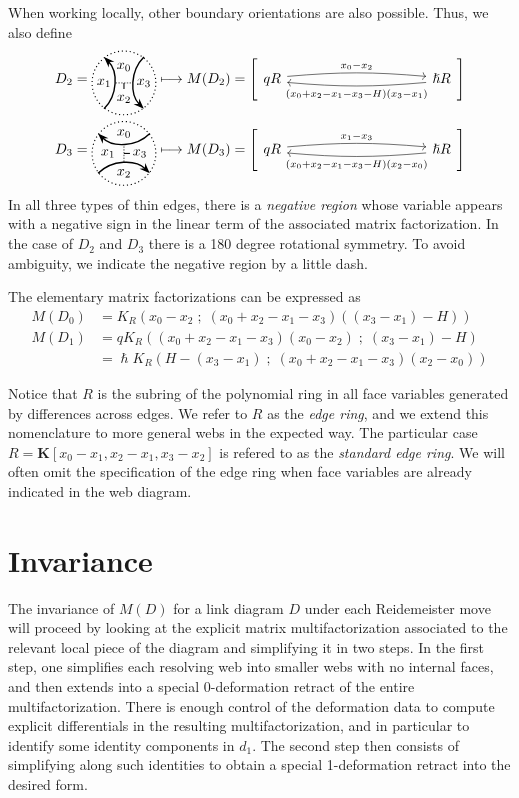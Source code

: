 \documentclass{article}
\renewcommand{\sc}{\; ; \;}
\newcommand{\mf}[4]{%
  \begin{tikzcd}[column sep=3.5cm, ampersand replacement=\&]
    {#1} \arrow[r, "#3", shift left=0.5ex, bend left=5,start anchor=east, end anchor=west] \arrow[r, leftarrow, "#4", shift right=0.5ex, bend right=5, swap, start anchor=east, end anchor=west] \& 
    {#2}
  \end{tikzcd}%
}
\theoremstyle{plain} %
\theoremstyle{definition} %
\theoremstyle{remark} %
\begin{document}
When working locally, other boundary orientations are also possible. Thus, we also define
\begin{align*}
	D_2=\UnorientedHorizontalThinEdgeStandard 
	&
	\longmapsto M(D_2)=\left[\mf{q R}{\hslash R}{x_0-x_2}{(x_0+x_2-x_1-x_3-H)(x_3-x_1)}\right]
	\\
	D_3=\UnorientedVerticalThinEdgeStandard 
	&
	\longmapsto M(D_3)=\left[\mf{q R}{\hslash R}{x_1-x_3}{(x_0+x_2-x_1-x_3-H)(x_2-x_0)}\right]
\end{align*}
In all three types of thin edges, there is a \emph{negative region} whose variable appears with a negative sign in the linear term of the associated matrix factorization. In the case of $D_2$ and $D_3$ there is a 180 degree rotational symmetry. To avoid ambiguity, we indicate the negative region by a little dash.



The elementary matrix factorizations can be expressed as
\begin{align*}
	M(D_0)
	&
	=K_R(x_0-x_2\sc(x_0+x_2-x_1-x_3)((x_3-x_1)-H))
	\\
	M(D_1)    
	&
	= qK_R((x_0+x_2-x_1-x_3)(x_0-x_2)\sc (x_3-x_1)-H)
	\\
	&
	=\hslash K_R(H-(x_3-x_1)\sc(x_0+x_2-x_1-x_3)(x_2-x_0))
\end{align*}

Notice that $R$ is the subring of the polynomial ring in all face variables generated by differences across edges. We refer to $R$ as the \emph{edge ring}, and we extend this nomenclature to more general webs in the expected way. The particular case $R=\mathbf K[x_0-x_1,x_2-x_1,x_3-x_2]$ is refered to as the \emph{standard edge ring}. We will often omit the specification of the edge ring when face variables are already indicated in the web diagram.


\section{Invariance}

The invariance of $M(D)$ for a link diagram $D$ under each Reidemeister move will proceed by looking at the explicit matrix multifactorization associated to the relevant local piece of the diagram and simplifying it in two steps. In the first step, one simplifies each resolving web into smaller webs with no internal faces, and then extends into a special 0-deformation retract of the entire multifactorization. There is enough control of the deformation data to compute explicit differentials in the resulting multifactorization, and in particular to identify some identity components in $d_1$. The second step then consists of simplifying along such identities to obtain a special 1-deformation retract into the desired form.
\end{document}
